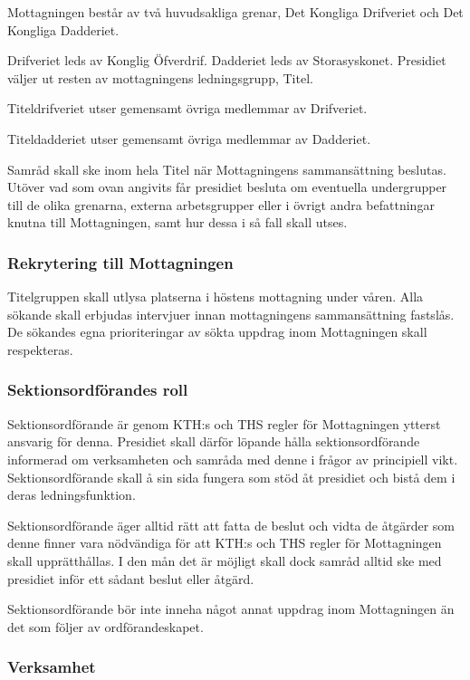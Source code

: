 \documentclass{dgovdoc}
\begin{document}
Mottagningen består av två huvudsakliga grenar, Det Kongliga Drifveriet och Det
Kongliga Dadderiet.

Drifveriet leds av Konglig Öfverdrif. Dadderiet leds av Storasyskonet.
Presidiet väljer ut resten av mottagningens ledningsgrupp, Titel.

Titeldrifveriet utser gemensamt övriga medlemmar av Drifveriet.

Titeldadderiet utser gemensamt övriga medlemmar av Dadderiet.

Samråd skall ske inom hela Titel när Mottagningens sammansättning beslutas.
Utöver vad som ovan angivits får presidiet besluta om eventuella undergrupper
till de olika grenarna, externa arbetsgrupper eller i övrigt andra befattningar
knutna till Mottagningen, samt hur dessa i så fall skall utses.

\subsubsection{Rekrytering till Mottagningen}

Titelgruppen skall utlysa platserna i höstens mottagning under våren. Alla
sökande skall erbjudas intervjuer innan mottagningens sammansättning fastslås.
De sökandes egna prioriteringar av sökta uppdrag inom Mottagningen skall
respekteras.

\subsubsection{Sektionsordförandes roll}

Sektionsordförande är genom KTH:s och THS regler för Mottagningen ytterst
ansvarig för denna. Presidiet skall därför löpande hålla sektionsordförande
informerad om verksamheten och samråda med denne i frågor av principiell vikt.
Sektionsordförande skall å sin sida fungera som stöd åt presidiet och bistå dem
i deras ledningsfunktion.

Sektionsordförande äger alltid rätt att fatta de beslut och vidta de åtgärder
som denne finner vara nödvändiga för att KTH:s och THS regler för Mottagningen
skall upprätthållas. I den mån det är möjligt skall dock samråd alltid ske med
presidiet inför ett sådant beslut eller åtgärd.

Sektionsordförande bör inte inneha något annat uppdrag inom Mottagningen än det
som följer av ordförandeskapet.

\subsubsection{Verksamhet}
\end{document}
